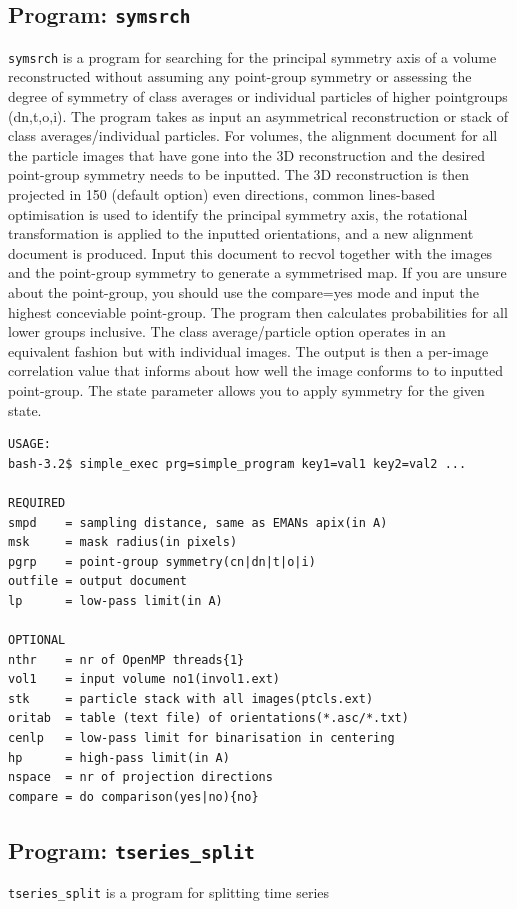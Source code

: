 \documentclass[a4paper,11pt]{article}
\newcommand{\prgname}[1]{\textcolor{NavyBlue}{\texttt{#1}}}
\begin{document}
\subsection{Program: \prgname{symsrch}}
\label{symsrch}
\prgname{symsrch} is a program for searching for the principal symmetry axis of a volume reconstructed without assuming any point-group symmetry or assessing the degree of symmetry of class averages or individual particles of higher pointgroups (dn,t,o,i). The program takes as input an asymmetrical reconstruction or stack of class averages/individual particles. For volumes, the alignment document for all the particle images that have gone into the 3D reconstruction and the desired point-group symmetry needs to be inputted. The 3D reconstruction is then projected in 150 (default option) even directions, common lines-based optimisation is used to identify the principal symmetry axis, the rotational transformation is applied to the inputted orientations, and a new alignment document is produced. Input this document to recvol together with the images and the point-group symmetry to generate a symmetrised map. If you are unsure about the point-group, you should use the compare=yes mode and input the highest conceviable point-group. The program then calculates probabilities for all lower groups inclusive. The class average/particle option operates in an equivalent fashion but with individual images. The output is then a per-image correlation value that informs about how well the image conforms to to inputted point-group. The state parameter allows you to apply symmetry for the given state. 

\begin{verbatim}
USAGE:
bash-3.2$ simple_exec prg=simple_program key1=val1 key2=val2 ...

REQUIRED
smpd    = sampling distance, same as EMANs apix(in A)
msk     = mask radius(in pixels)
pgrp    = point-group symmetry(cn|dn|t|o|i)
outfile = output document
lp      = low-pass limit(in A)

OPTIONAL
nthr    = nr of OpenMP threads{1}
vol1    = input volume no1(invol1.ext)
stk     = particle stack with all images(ptcls.ext)
oritab  = table (text file) of orientations(*.asc/*.txt)
cenlp   = low-pass limit for binarisation in centering
hp      = high-pass limit(in A)
nspace  = nr of projection directions
compare = do comparison(yes|no){no}
\end{verbatim}

\subsection{Program: \prgname{tseries\_split}}
\label{tseries_split}
\prgname{tseries\_split} is a program for splitting time series 
\end{document}
